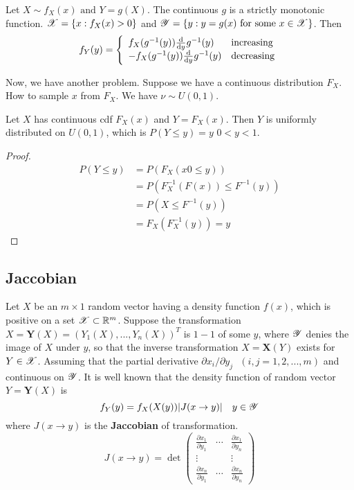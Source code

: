 	\begin{theorem}
		Let $X\sim f_X(x) \text{ and } Y=g(X)$. The continuous $g$ is a strictly monotonic function. $\mathscr{X} = \{x:f_X(x)>0\}$ and $\mathscr{Y}=\{y: y=g(x) \text{ for some } x\in\mathscr{X}\}$. Then
		$$f_Y(y) = \left\{
		\begin{array}{ll}
			f_X(g^{-1}(y)) \frac{\mathrm{d}}{\mathrm{d} y}g^{-1}(y) & \text{increasing}\\
			-f_X(g^{-1}(y)) \frac{\mathrm{d}}{\mathrm{d} y}g^{-1}(y) & \text{decreasing}
		\end{array}
		\right.$$
	\end{theorem}

	Now, we have another problem. Suppose we have a continuous distribution $F_X$. How to sample $x$ from $F_X$. We have $\nu \sim U(0,1)$.
	\begin{theorem}
		Let $X$ has continuous cdf $F_X(x)$ and $Y = F_X(x)$. Then $Y$ is uniformly distributed on $U(0,1)$, which is $P(Y\leq y)=y$ $0<y<1$.
	\end{theorem}
	\begin{proof}
		\begin{align*}
			P(Y\leq y) &= P(F_X(x0\leq y))\\
					   &= P(F_X^{-1}(F(x))\leq F^{-1}(y))\\
					   &= P(X\leq F^{-1}(y))\\
					   &= F_X(F_X^{-1}(y)) = y 
		\end{align*}
	\end{proof}
	\subsection{Jaccobian}
	\begin{definition}[Jaccobian]
		Let $X$ be an $m\times 1$ random vector having a density function $f(x)$, which is positive on a set $\mathscr{X} \subset \mathbb{R}^m$. Suppose the transformation $X = \textbf{Y}(X)=\left(Y_1(X),...,Y_n(X)\right)^T$ is $1-1$ of some $y$, where $\mathscr{Y}$ denies the image of $X$ under $y$, so that the inverse transformation $X= \textbf{X}(Y)$ exists for $Y\in\mathscr{X}$. Assuming that the partial derivative $\partial x_i/\partial y_j \text{  }(i,j=1,2,...,m)$ and continuous on $\mathscr{Y}$. It is well known that the density function of random vector $Y=\textbf{Y}(X)$ is 
		$$f_Y(y) = f_X(X(y))|J(x\to y)| \quad y\in \mathscr{Y}$$
		where $J(x\to y)$ is the \textbf{Jaccobian} of transformation.
		$$
		J(x\to y) = \det \left(
		\begin{matrix}
			\frac{\partial x_1}{\partial y_1} & \cdots & \frac{\partial x_1}{\partial y_n}\\
			\vdots & & \vdots\\
			\frac{\partial x_n}{\partial y_1} & \cdots & \frac{\partial x_n}{\partial y_n}
		\end{matrix}
		\right)
		$$
	\end{definition}


